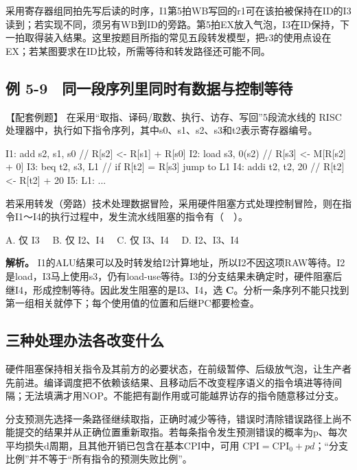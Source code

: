 采用寄存器组同拍先写后读的时序，I1第5拍WB写回的r1可在该拍被保持在ID的I3读到；若实现不同，须另有WB到ID的旁路。第5拍EX放入气泡，I3在ID保持，下一拍取得装入结果。这里按题目所指的常见五段转发模型，把r3的使用点设在EX；若某图要求在ID比较，所需等待和转发路径还可能不同。

\subsection{例 5-9　同一段序列里同时有数据与控制等待}\label{CO05-example-9}

【配套例题】 在采用``取指、译码/取数、执行、访存、写回''5段流水线的 RISC 处理器中，执行如下指令序列，其中s0、s1、s2、s3和t2表示寄存器编号。

\par\medskip\noindent\begin{minipage}{\linewidth}
\begin{codeblock}[language={}]
I1: add  s2, s1, s0  // R[s2] <- R[s1] + R[s0]
I2: load s3, 0(s2)   // R[s3] <- M[R[s2] + 0]
I3: beq  t2, s3, L1  // if R[t2] = R[s3] jump to L1
I4: addi t2, t2, 20  // R[t2] <- R[t2] + 20
I5: L1: ...
\end{codeblock}
\end{minipage}\par\medskip

若采用转发（旁路）技术处理数据冒险，采用硬件阻塞方式处理控制冒险，则在指令I1～I4的执行过程中，发生流水线阻塞的指令有（　）。

A. 仅 I3　 B. 仅 I2、I4　 C. 仅 I3、I4　 D. I2、I3、I4

\textbf{解析。} I1的ALU结果可以及时转发给I2计算地址，所以I2不因这项RAW等待。I2是load，I3马上使用s3，仍有load-use等待。I3的分支结果未确定时，硬件阻塞后继I4，形成控制等待。因此发生阻塞的是I3、I4，选 \textbf{C}。分析一条序列不能只找到第一组相关就停下；每个使用值的位置和后继PC都要检查。

\subsection{三种处理办法各改变什么}\label{ux4e09ux79cdux5904ux7406ux529eux6cd5ux5404ux6539ux53d8ux4ec0ux4e48}

硬件阻塞保持相关指令及其前方的必要状态，在前级暂停、后级放气泡，让生产者先前进。编译调度把不依赖该结果、且移动后不改变程序语义的指令填进等待间隔；无法填满才用NOP。不能把有副作用或可能越界访存的指令随意移过分支。

分支预测先选择一条路径继续取指，正确时减少等待，错误时清除错误路径上尚不能提交的结果并从正确位置重新取指。若每条指令发生预测错误的概率为p、每次平均损失d周期，且其他开销已包含在基本CPI中，可用 \(\mathrm{CPI}=\mathrm{CPI}_{0}+pd\)；``分支比例''并不等于``所有指令的预测失败比例''。

